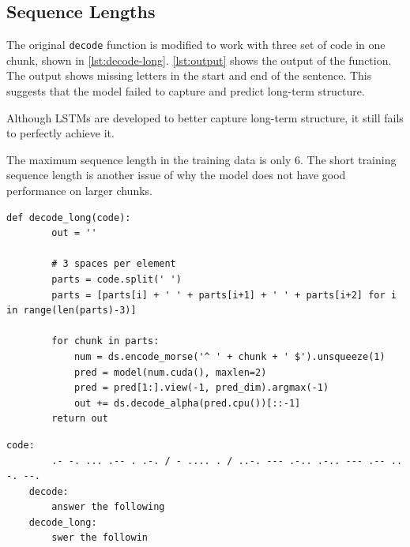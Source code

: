 \documentclass[twocolumn]{article}
\begin{document}
\subsection{Sequence Lengths}

The original \lstinline{decode} function is modified to work with three set of code in one chunk, shown in \cref{lst:decode-long}. \cref{lst:output} shows the output of the function. The output shows missing letters in the start and end of the sentence. This suggests that the model failed to capture and predict long-term structure.

Although LSTMs are developed to better capture long-term structure, it still fails to perfectly achieve it.

The maximum sequence length in the training data is only 6. The short training sequence length is another issue of why the model does not have good performance on larger chunks.

\begin{lstlisting}[caption={Modified decode function with longer chunks.}, label={lst:decode-long}]
    def decode_long(code):
        out = ''

        # 3 spaces per element
        parts = code.split(' ')
        parts = [parts[i] + ' ' + parts[i+1] + ' ' + parts[i+2] for i in range(len(parts)-3)]

        for chunk in parts:
            num = ds.encode_morse('^ ' + chunk + ' $').unsqueeze(1)
            pred = model(num.cuda(), maxlen=2)
            pred = pred[1:].view(-1, pred_dim).argmax(-1)
            out += ds.decode_alpha(pred.cpu())[::-1]
        return out
\end{lstlisting}

\begin{lstlisting}[caption={Output of \lstinline{decode_long}.},language={}, label={lst:output}]
    code:
        .- -. ... .-- . .-. / - .... . / ..-. --- .-.. .-.. --- .-- .. -. --.
    decode:
        answer the following
    decode_long:
        swer the followin
\end{lstlisting}
\end{document}
